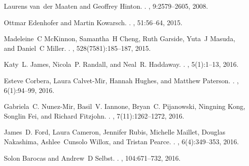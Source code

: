 \documentclass{article}
\begin{document}
\begin{thebibliography}{10}
	Laurens van~der Maaten and Geoffrey Hinton.
	.
	, 9:2579--2605, 2008.
	
	Ottmar Edenhofer and Martin Kowarsch.
	.
	, 51:56--64, 2015.
	
	Madeleine~C McKinnon, Samantha~H Cheng, Ruth Garside, Yuta~J Masuda, and
	Daniel~C Miller.
	.
	, 528(7581):185--187, 2015.
	
	Katy~L. James, Nicola~P. Randall, and Neal~R. Haddaway.
	.
	, 5(1):1--13, 2016.
	
	Esteve Corbera, Laura Calvet-Mir, Hannah Hughes, and Matthew Paterson.
	.
	, 6(1):94--99, 2016.
	
	Gabriela~C. Nunez-Mir, Basil~V. Iannone, Bryan~C. Pijanowski, Ningning Kong,
	Songlin Fei, and Richard Fitzjohn.
	.
	, 7(11):1262--1272, 2016.
	
	James~D. Ford, Laura Cameron, Jennifer Rubis, Michelle Maillet, Douglas
	Nakashima, Ashlee~Cunsolo Willox, and Tristan Pearce.
	.
	, 6(4):349--353, 2016.
	
	Solon Barocas and Andrew~D Selbst.
	.
	, 104:671--732, 2016.
	
\end{thebibliography}


%
\end{document}
